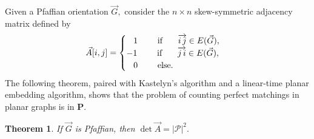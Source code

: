 \documentclass[twoside]{article}
\newcounter{lecnum}
\newtheorem{theorem}{Theorem}[lecnum]
\begin{document}
Given a Pfaffian orientation $\vec{G},$ consider the $n\times n$ skew-symmetric adjacency matrix defined by
\[
\vec{A}[i,j] = \begin{cases}
\,  \, \, \, \, 1 \indent  \, \, \, \text{ if } \indent  \overrightarrow{i\, j}\in E(\vec{G}), \\
-1 \indent \, \, \,  \text{ if }  \indent \overrightarrow{j\, i} \in E(\vec{G}),\\
\, \, \, \, \, 0  \, \, \, \indent \text{ else.}
\end{cases}
\]
The following theorem, paired with Kastelyn's algorithm and a linear-time planar embedding algorithm, shows that the problem of counting perfect matchings in planar graphs is in $\mathbf{P}.$
\begin{theorem}
If $\vec{G}$ is Pfaffian, then $\det \vec{A}= |\mathcal{P}|^2.$ 
\end{theorem}
\end{document}
